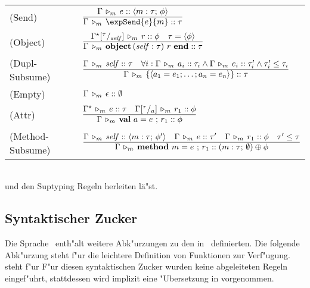      \begin{tabular}{ll}
    \mbox{(Send)\ }         & $\RULE{\Tjm{\Gamma}{e}{\typeObject{\rtypeMethod{m}{\tau}{\phi}}}}
                              {\Tjm{\Gamma}{\expSend{e}{m}}{\tau}}$ \\[4mm]
    \mbox{(Object)\ }       & $\RULE{\Tjm{\Gamma^\star\SUB{\tau}{\self}}{r}{\phi}
                               \quad
                               \tau = \typeObject{\phi}}
                              {\Tjm{\Gamma}{\expObject{\self:\tau}{r}}{\tau}}$ \\[4mm]
    \mbox{(Dupl-Subsume)\ } & $\RULE{\Tjm{\Gamma}{\self}{\tau}
                               \quad
                               \forall i:\Tjm{\Gamma}{a_i}{\tau_i}
                                             \wedge \Tjm{\Gamma}{e_i}{\tau_i'}
                                             \wedge \tau_i' \le \tau_i}
                              {\Tjm{\Gamma}{\expDupl{a_1=e_1;\ldots;a_n=e_n}}{\tau}}$\\[4mm]
    \mbox{(Empty)\ }          & $\Gamma\,\triangleright_m\,\epsilon\mathrel{::}\emptyset$ \\[2mm]
    \mbox{(Attr)\ }           & $\RULE{\Tjm{\Gamma^\star}{e}{\tau}
                                 \quad
                                 \Tjm{\Gamma\SUB{\tau}{a}}{r_1}{\phi}}
                                {\Tjm{\Gamma}{\rowVal{a}{e}{r_1}}{\phi}}$ \\[4mm]
    \mbox{(Method-Subsume)\ } & $\RULE{\Tjm{\Gamma}{\self}{\typeObject{\rtypeMethod{m}{\tau}{\phi'}}}
                                 \quad
                                 \Tjm{\Gamma}{e}{\tau'}
                                 \quad
                                 \Tjm{\Gamma}{r_1}{\phi}
                                 \quad
                                 \tau' \le \tau}
                                {\Tjm{\Gamma}{\rowMethod{m}{e}{r_1}}
                                             {(\rtypeMethod{m}{\tau}{\rtypeEmpty}) \oplus \phi}}$
  \end{tabular} \\[7mm]
  und den Suptyping Regeln herleiten l\"a"st.


\subsection{Syntaktischer Zucker}

Die Sprache \LTWOO\ enth"alt weitere Abk"urzungen zu den in \LTWO\ definierten. Die folgende Abk"urzung steht f"ur die leichtere Definition von Funktionen zur Verf"ugung.
\beqns
\eeqns
steht f"ur
\beqns
\eeqns
F"ur diesen syntaktischen Zucker wurden keine abgeleiteten Regeln eingef"uhrt, stattdessen wird implizit
eine "Ubersetzung in  vorgenommen.

